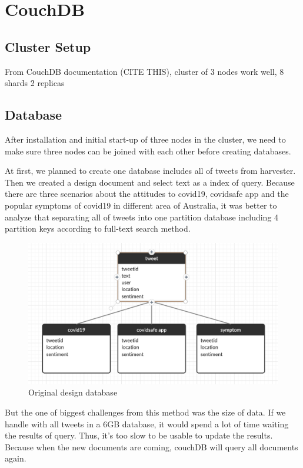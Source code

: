 \section{CouchDB}
\subsection{Cluster Setup}
 From CouchDB documentation (CITE THIS), cluster of 3 nodes work well, 8 shards 2 replicas 

\subsection{Database} 
After installation and initial start-up of three nodes in the cluster, we need to make sure three nodes can be joined with each other before creating databases. 

At first, we planned to create one database includes all of tweets from harvester. Then we created a design document and select text as a index of query. Because there are three scenarios about the attitudes to covid19, covidsafe app and the popular symptoms of covid19 in different area of Australia, it was better to analyze that separating all of tweets into one partition database including 4 partition keys according to full-text search method. 

\begin{figure}[H]
    \centering
    \includegraphics[scale=0.4]{city_analytics/report/images/db1.png}
    \caption{Original design database}
    \label{fig:my_label}
\end{figure}

But the one of biggest challenges from this method was the size of data.  If we handle with all tweets in a 6GB database, it would spend a lot of time waiting the results of query. Thus, it's too slow to be usable to update the results. Because when the new documents are coming, couchDB will query all documents again.

